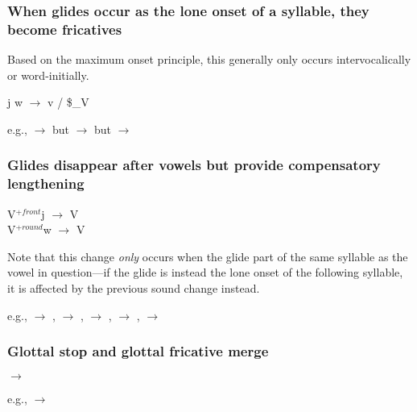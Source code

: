 
\subsubsection{When glides occur as the lone onset of a syllable, they become fricatives}

Based on the maximum onset principle, this generally only occurs intervocalically or word-initially.

\begin{center}
    j w $\to$ \paljfric{} v / \$\_V
\end{center}

e.g.,   $\to$  but   $\to$  but   $\to$ 

\subsubsection{Glides disappear after vowels but provide compensatory lengthening}

\begin{center}
    V$^{+front}$j $\to$ V\lgth\\
    V$^{+round}$w $\to$ V\lgth
\end{center}

Note that this change \emph{only} occurs when the glide part of the same syllable as the vowel in question---if the glide is instead the lone onset of the following syllable, it is affected by the previous sound change instead.

e.g.,   $\to$ ,   $\to$ ,   $\to$ ,   $\to$  ,   $\to$ 

\subsubsection{Glottal stop and glottal fricative merge}

\begin{center}
    \phipa{\glotstop} $\to$ 
\end{center}

e.g.,   $\to$ 

